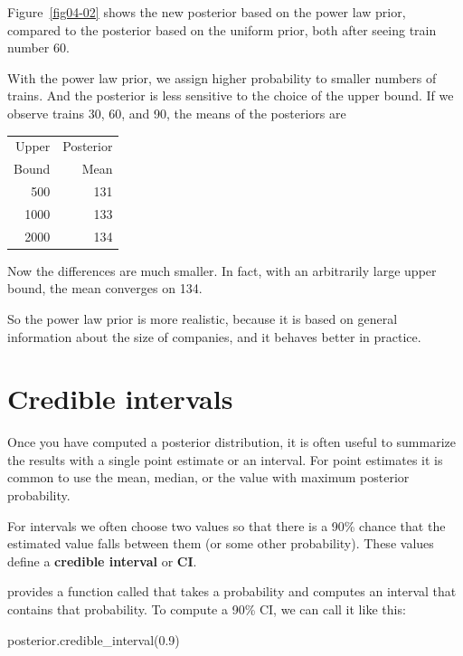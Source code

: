 \documentclass[12pt]{book}
\theoremstyle{exercise}
\begin{document}
Figure~\ref{fig04-02} shows the new posterior based on the power law prior, compared to the posterior based on the uniform prior, both after seeing train number 60.

With the power law prior, we assign higher probability to smaller numbers of trains.
And the posterior is less sensitive to the choice of the upper bound.
If we observe trains 30, 60, and 90, the means of the posteriors are

\begin{tabular}{rr}
\toprule
Upper & Posterior \\
Bound & Mean \\
\midrule
  500 & 131 \\
  1000 & 133 \\
  2000 & 134 \\
\bottomrule
\end{tabular}

Now the differences are much smaller.  In fact,
with an arbitrarily large upper bound, the mean converges on 134.

So the power law prior is more realistic, because it is based on
general information about the size of companies, and it
behaves better in practice.


\section{Credible intervals}
\label{credible}

Once you have computed a posterior distribution, it is often useful
to summarize the results with a single point estimate or an interval.
For point estimates it is common to use the mean, median, or the
value with maximum posterior probability.


For intervals we often choose two values so that there is a 90\% chance that the estimated value falls between them (or some other probability).
These values define a {\bf credible interval} or {\bf CI}.

 provides a function called  that takes a probability and computes an interval that contains that probability.
To compute a 90\% CI, we can call it like this:


\begin{code}
posterior.credible_interval(0.9)
\end{code}
\end{document}
